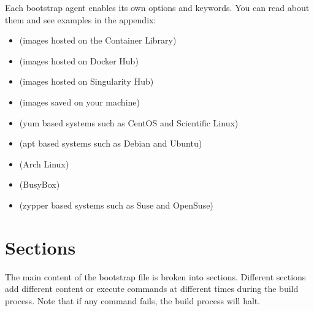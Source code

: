\documentclass[letterpaper,10pt,english]{sphinxmanual}
\begin{document}
Each bootstrap agent enables its own options and keywords. You can read about
them and see examples in the appendix:
\begin{itemize}
\item {} 
{\hyperref[\detokenize{appendix:build-library-module}]{}} (images hosted on the Container Library)

\item {} 
{\hyperref[\detokenize{appendix:build-docker-module}]{}} (images hosted on Docker Hub)

\item {} 
{\hyperref[\detokenize{appendix:build-shub}]{}} (images hosted on Singularity Hub)

\item {} 
{\hyperref[\detokenize{appendix:build-localimage}]{}} (images saved on your machine)

\item {} 
{\hyperref[\detokenize{appendix:build-yum}]{}} (yum based systems such as CentOS and Scientific Linux)

\item {} 
{\hyperref[\detokenize{appendix:build-debootstrap}]{}} (apt based systems such as Debian and Ubuntu)

\item {} 
{\hyperref[\detokenize{appendix:build-arch}]{}} (Arch Linux)

\item {} 
{\hyperref[\detokenize{appendix:build-busybox}]{}} (BusyBox)

\item {} 
{\hyperref[\detokenize{appendix:build-zypper}]{}} (zypper based systems such as Suse and OpenSuse)

\end{itemize}


\section{Sections}
\label{\detokenize{definition_files:sections}}
The main content of the bootstrap file is broken into sections. Different
sections add different content or execute commands at different times during the
build process. Note that if any command fails, the build process will halt.
\end{document}
